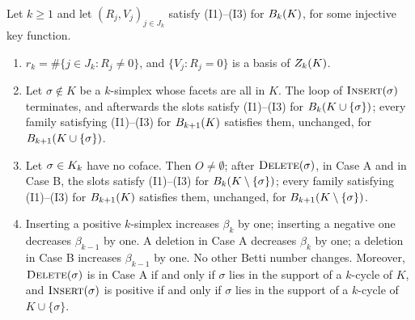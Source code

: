 \begin{theorem}[Exactness]\label{thm:exact}
Let $k\ge1$ and let $(R_j,V_j)_{j\in J_k}$ satisfy (I1)--(I3) for $B_{k}(K)$,
for some injective key function.
\begin{enumerate}
\item[(a)] $r_k=\#\{j\in J_k : R_j\ne0\}$, and $\{V_j : R_j=0\}$ is a basis of
  $Z_{k}(K)$.
\item[(b)] Let $\sigma\notin K$ be a $k$-simplex whose facets are all in $K$.
  The loop of $\textup{\textsc{Insert}}(\sigma)$
  terminates, and afterwards the slots satisfy (I1)--(I3) for
  $B_{k}(K\cup\{\sigma\})$; every family satisfying (I1)--(I3) for
  $B_{k+1}(K)$ satisfies them, unchanged, for $B_{k+1}(K\cup\{\sigma\})$.
\item[(c)] Let $\sigma\in K_{k}$ have no coface. Then $O\ne\emptyset$; after
  $\textup{\textsc{Delete}}(\sigma)$, in Case A and in Case B, the slots satisfy (I1)--(I3) for
  $B_{k}(K\setminus\{\sigma\})$; every family satisfying (I1)--(I3) for
  $B_{k+1}(K)$ satisfies them, unchanged, for $B_{k+1}(K\setminus\{\sigma\})$.
\item[(d)] Inserting a positive $k$-simplex increases $\beta_k$ by one; inserting
  a negative one decreases $\beta_{k-1}$ by one. A deletion in Case A decreases
  $\beta_k$ by one; a deletion in Case B increases $\beta_{k-1}$ by one. No
  other Betti number changes. Moreover, $\textup{\textsc{Delete}}(\sigma)$ is in Case A if and only
  if $\sigma$ lies in the support of a $k$-cycle of $K$, and $\textup{\textsc{Insert}}(\sigma)$ is
  positive if and only if $\sigma$ lies in the support of a $k$-cycle of
  $K\cup\{\sigma\}$.
\end{enumerate}
\end{theorem}

